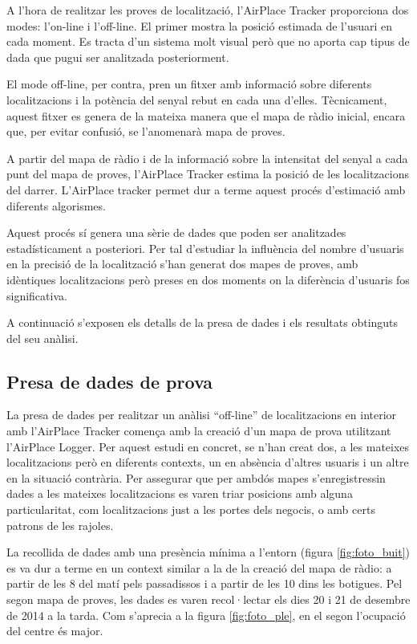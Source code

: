 
A l'hora de realitzar les proves de localització, l'AirPlace Tracker proporciona dos modes: l'on-line i l'off-line. El primer mostra la posició estimada de l'usuari en cada moment. Es tracta d'un sistema molt visual però que no aporta cap tipus de dada que pugui ser analitzada posteriorment.

El mode off-line, per contra, pren un fitxer amb informació sobre diferents localitzacions i la potència del senyal rebut en cada una d'elles. Tècnicament, aquest fitxer es genera de la mateixa manera que el mapa de ràdio inicial, encara que, per evitar confusió, se l'anomenarà mapa de proves.

A partir del mapa de ràdio i de la informació sobre la intensitat del senyal a cada punt del mapa de proves, l'AirPlace Tracker estima la posició de les localitzacions del darrer. L'AirPlace tracker permet dur a terme aquest procés d'estimació amb diferents algorismes.

Aquest procés sí genera una sèrie de dades que poden ser analitzades estadísticament a posteriori. Per tal d'estudiar la influència del nombre d'usuaris en la precisió de la localització s'han generat dos mapes de proves, amb idèntiques localitzacions però preses en dos moments on la diferència d'usuaris fos significativa.

A continuació s'exposen els detalls de la presa de dades i els resultats obtinguts del seu anàlisi.

\subsection{Presa de dades de prova}

La presa de dades per realitzar un anàlisi ``off-line'' de localitzacions en interior amb l'AirPlace Tracker comença amb la creació d'un mapa de prova utilitzant l'AirPlace Logger. Per aquest estudi en concret, se n'han creat dos, a les mateixes localitzacions però en diferents contexts, un en absència d'altres usuaris i un altre en la situació contrària. Per assegurar que per ambdós mapes s'enregistressin dades a les mateixes localitzacions es varen triar posicions amb alguna particularitat, com localitzacions just a les portes dels negocis, o amb certs patrons de les rajoles.

La recollida de dades amb una presència mínima a l'entorn (figura \ref{fig:foto_buit}) es va dur a terme en un context similar a la de la creació del mapa de ràdio: a partir de les 8 del matí pels passadissos i a partir de les 10 dins les botigues. Pel segon mapa de proves, les dades es varen recol·lectar els dies 20 i 21 de desembre de 2014 a la tarda. Com s'aprecia a la figura \ref{fig:foto_ple}, en el segon l'ocupació del centre és major.

